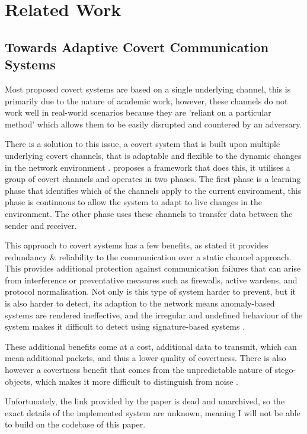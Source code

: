 \chapter{Related Work}
\label{ch:related_work}

\section{Towards Adaptive Covert Communication Systems}

Most proposed covert systems are based on a single underlying channel, this is primarily due to the nature of academic work, however, these channels do not work well in real-world scenarios because they are 'reliant on a particular method' \citep{TWACCS} which allows them to be easily disrupted and countered by an adversary.

There is a solution to this issue, a covert system that is built upon multiple underlying covert channels, that is adaptable and flexible to the dynamic changes in the network environment \citep{TWACCS}. \cite{TWACCS} proposes a framework that does this, it utilises a group of covert channels and operates in two phases. The first phase is a learning phase that identifies which of the channels apply to the current environment, this phase is continuous to allow the system to adapt to live changes in the environment. The other phase uses these channels to transfer data between the sender and receiver.

This approach to covert systems has a few benefits, as stated it provides redundancy \& reliability \citep{TWACCS} to the communication over a static channel approach. This provides additional protection against communication failures that can arise from interference or preventative measures such as firewalls, active wardens, and protocol normalisation. Not only is this type of system harder to prevent, but it is also harder to detect, its adaption to the network means anomaly-based systems are rendered ineffective, and the irregular and undefined behaviour of the system makes it difficult to detect using signature-based systems \citep{TWACCS}.

These additional benefits come at a cost, additional data to transmit, which can mean additional packets, and thus a lower quality of covertness. There is also however a covertness benefit that comes from the unpredictable nature of stego-objects, which makes it more difficult to distinguish from noise \citep{ECopSSUOCC}.

Unfortunately, the link provided by the paper is dead and unarchived, so the exact details of the implemented system are unknown, meaning I will not be able to build on the codebase of this paper.

